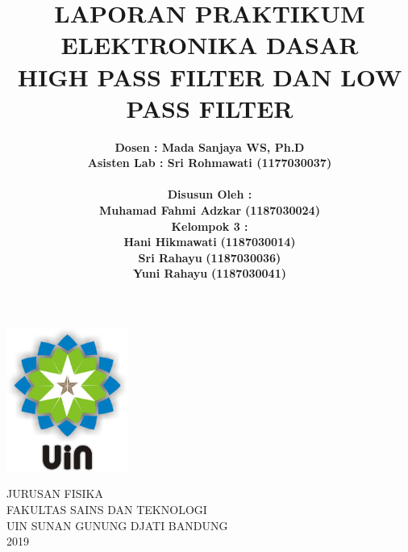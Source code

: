 \documentclass[12pt,a4paper]{article}
\begin{document}
\onehalfspacing
\begin{titlepage}

\title{\textbf{LAPORAN PRAKTIKUM ELEKTRONIKA DASAR
\\ HIGH PASS FILTER DAN LOW PASS FILTER}}  %
\author{\textbf {Dosen : Mada Sanjaya WS, Ph.D  }
\\ \textbf{Asisten Lab : Sri Rohmawati (1177030037)}
\\ \textbf{ }
\\ \textbf{Disusun Oleh :}
\\ \textbf{Muhamad Fahmi Adzkar} \textbf {(1187030024)}
\\ \textbf{Kelompok 3 :}
\\ \textbf{Hani Hikmawati} \textbf {(1187030014)}
\\ \textbf{Sri Rahayu} \textbf {(1187030036)}
\\ \textbf{Yuni Rahayu} \textbf {(1187030041)}}

\maketitle
\begin{center}
\vspace{1cm}
\includegraphics[width=4cm]{uin.png}
\vspace{1cm}

JURUSAN FISIKA\\
FAKULTAS SAINS DAN TEKNOLOGI\\
UIN SUNAN GUNUNG DJATI BANDUNG\\
2019\\
\end{center}
\end{titlepage}
\end{document}

